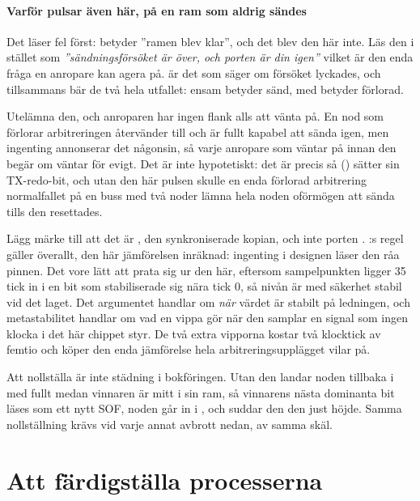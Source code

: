 \paragraph{Varför  pulsar även här, på en ram som aldrig sändes}
Det läser fel först:  betyder ”ramen blev klar”, och det blev den här inte. Läs den i
stället som \emph{”sändningsförsöket är över, och porten är din igen”} \textemdash{} vilket är den
enda fråga en anropare kan agera på.  är det som säger om försöket lyckades, och
tillsammans bär de två hela utfallet:  ensam betyder sänd,  med
 betyder förlorad.

Utelämna den, och anroparen har ingen flank alls att vänta på. En nod som förlorar arbitreringen
återvänder till  och är fullt kapabel att sända igen, men ingenting annonserar det
någonsin, så varje anropare som väntar på  innan den begär om väntar för evigt. Det är
inte hypotetiskt: det är precis så  () sätter sin TX-redo-bit, och
utan den här pulsen skulle en enda förlorad arbitrering \textemdash{} normalfallet på en buss med två
noder \textemdash{} lämna hela noden oförmögen att sända tills den resettades.

Lägg märke till att det är , den synkroniserade kopian, och inte porten
. :s regel gäller överallt, den här jämförelsen inräknad:
ingenting i designen läser den råa pinnen. Det vore lätt att prata sig ur den här, eftersom
sampelpunkten ligger 35 tick in i en bit som stabiliserade sig nära tick 0, så nivån är med säkerhet
stabil vid det laget. Det argumentet handlar om \emph{när} värdet är stabilt på ledningen, och
metastabilitet handlar om vad en vippa gör när den samplar en signal som ingen klocka i det här
chippet styr. De två extra vipporna kostar två klocktick av femtio och köper den enda jämförelse hela
arbitreringsupplägget vilar på.

Att nollställa  är inte städning i bokföringen. Utan den landar noden tillbaka i
 med  fullt medan vinnaren är mitt i sin ram, så vinnarens nästa
dominanta bit läses som ett nytt SOF, noden går in i , och  suddar
den  den just höjde. Samma nollställning krävs vid varje annat avbrott nedan, av samma
skäl.

\section{Att färdigställa processerna}
\label{c17:sec:complete}

